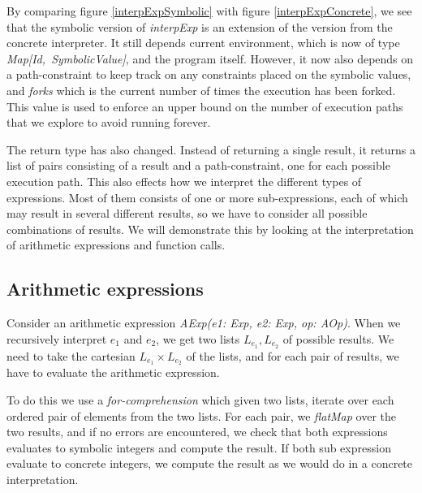 By comparing figure \ref{interpExpSymbolic} with figure \ref{interpExpConcrete}, we see that the symbolic version of \textsl{interpExp} is an extension of the version from the concrete interpreter. It still depends current environment, which is now of type \mbox{\textsl{Map[Id, SymbolicValue]}}, and the program itself. However, it now also depends on a path-constraint to keep track on any constraints placed on the symbolic values,
and \textsl{forks} which is the current number of times the execution has been forked. This value is used to enforce an upper bound on the number of execution paths that we explore to avoid running forever.

The return type has also changed. Instead of returning a single result, it returns a list of pairs consisting of a result and a path-constraint, one for each possible execution path. This also effects how we interpret the different types of expressions. Most of them consists of one or more sub-expressions, each of which may result in several different results, so we have to consider all possible combinations of results. We will demonstrate this by looking at the interpretation of arithmetic expressions and function calls. 

\subsection{Arithmetic expressions}
Consider an arithmetic expression 
\textsl{AExp(e1: Exp, e2: Exp, op: AOp)}. When we recursively interpret $e_1$ and $e_2$, we get two lists $L_{e_1}, L_{e_2}$ of possible results. We need to take the cartesian $L_{e_1} \times L_{e_2}$ of the lists, and for each pair of results, we have to evaluate the arithmetic expression. 

To do this we use a \textsl{for-comprehension} which given two lists, iterate over each ordered pair of elements from the two lists.  For each pair, we \textsl{flatMap} over the two results, and if no errors are encountered, we check that both expressions evaluates to symbolic integers and compute the result. If both sub expression evaluate to concrete integers, we compute the result as we would do in a concrete interpretation. 

